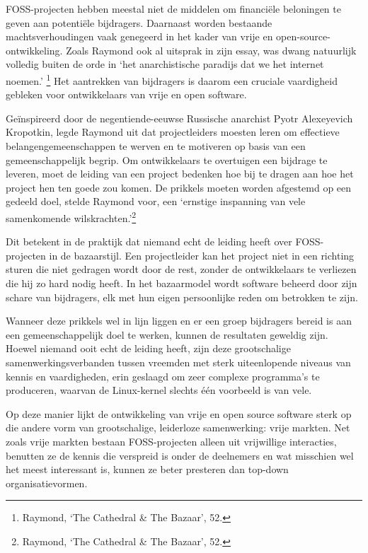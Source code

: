 \documentclass[smalldemyvopaper,11pt,twoside,onecolumn,openright,extrafontsizes,hidelinks]{memoir}
\begin{document}
FOSS-projecten hebben meestal niet de middelen om financiële beloningen
te geven aan potentiële bijdragers. Daarnaast worden bestaande
machtsverhoudingen vaak genegeerd in het kader van vrije en
open-source-ontwikkeling. Zoals Raymond ook al uitsprak in zijn essay,
was dwang natuurlijk volledig buiten de orde in `het anarchistische
paradijs dat we het internet noemen.' \footnote{\hspace{0pt}Raymond,
  `The Cathedral \& The Bazaar', 52.} Het aantrekken van bijdragers is
daarom een cruciale vaardigheid gebleken voor ontwikkelaars van vrije en
open software.

Geïnspireerd door de negentiende-eeuwse Russische anarchist Pyotr
Alexeyevich Kropotkin, legde Raymond uit dat projectleiders moesten
leren om effectieve belangengemeenschappen te werven en te motiveren op
basis van een gemeenschappelijk begrip. Om ontwikkelaars te overtuigen
een bijdrage te leveren, moet de leiding van een project bedenken hoe
bij te dragen aan hoe het project hen ten goede zou komen. De prikkels
moeten worden afgestemd op een gedeeld doel, stelde Raymond voor, een
`ernstige inspanning van vele samenkomende wilskrachten.'\footnote{\hspace{0pt}Raymond,
  `The Cathedral \& The Bazaar', 52.}

Dit betekent in de praktijk dat niemand echt de leiding heeft over
FOSS-projecten in de bazaarstijl. Een projectleider kan het project niet
in een richting sturen die niet gedragen wordt door de rest, zonder de
ontwikkelaars te verliezen die hij zo hard nodig heeft. In het
bazaarmodel wordt software beheerd door zijn schare van bijdragers, elk
met hun eigen persoonlijke reden om betrokken te zijn.

Wanneer deze prikkels wel in lijn liggen en er een groep bijdragers
bereid is aan een gemeenschappelijk doel te werken, kunnen de resultaten
geweldig zijn. Hoewel niemand ooit echt de leiding heeft, zijn deze
grootschalige samenwerkingsverbanden tussen vreemden met sterk
uiteenlopende niveaus van kennis en vaardigheden, erin geslaagd om zeer
complexe programma's te produceren, waarvan de Linux-kernel slechts één
voorbeeld is van vele.

Op deze manier lijkt de ontwikkeling van vrije en open source software
sterk op die andere vorm van grootschalige, leiderloze samenwerking:
vrije markten. Net zoals vrije markten bestaan FOSS-projecten alleen uit
vrijwillige interacties, benutten ze de kennis die verspreid is onder de
deelnemers en wat misschien wel het meest interessant is, kunnen ze
beter presteren dan top-down organisatievormen.
\end{document}
